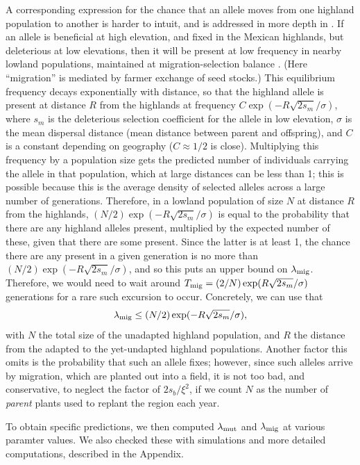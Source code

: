 A corresponding expression for the chance that an allele moves from one highland population to another is harder to intuit,
and is addressed in more depth in \citep{ralphcoop2013patches}.
If an allele is beneficial at high elevation, and fixed in the Mexican highlands,
but deleterious at low elevations,
then it will be present at low frequency in nearby lowland populations,
maintained at migration-selection balance \citep{slatkin1973geneflow}.
(Here ``migration'' is mediated by farmer exchange of seed stocks.)
This equilibrium frequency decays exponentially with distance,
so that the highland allele is present at distance $R$ from the highlands at frequency $C \exp(- R \sqrt{2s_m} / \sigma)$,
where $s_m$ is the deleterious selection coefficient for the allele in low elevation,
$\sigma$ is the mean dispersal distance (mean distance between parent and offspring),
and $C$ is a constant depending on geography ($C\approx 1/2$ is close).
Multiplying this frequency by a population size gets the predicted number of individuals carrying the allele in that population,
which at large distances can be less than 1;
this is possible because this is the average density of selected alleles across a large number of generations.
Therefore, in a lowland population of size $N$ at distance $R$ from the highlands,
$(N/2)  \exp(- R \sqrt{2s_m} / \sigma)$ is equal to the probability that there are any highland alleles present,
multiplied by the expected number of these, given that there are some present.
Since the latter is at least 1,
the chance there are any present in a given generation is no more than $(N/2) \exp(- R \sqrt{2s_m} / \sigma)$,
and so this puts an upper bound on $\lambda_{\text{mig}}$.
Therefore, we would need to wait around $T_{\text{mig}} = (2/N)\exp(R \sqrt{2s_m} / \sigma)$ generations 
for a rare such excursion to occur.
Concretely, we can use that
\begin{align}
  \lambda_{\text{mig}} \le (N/2)  \exp(- R \sqrt{2s_m} / \sigma) ,
\end{align}
with $N$ the total size of the unadapted highland population,
and $R$ the distance from the adapted to the yet-undapted highland populations.
Another factor this omits is the probability that such an allele fixes;
however, since such alleles arrive by migration, which are planted out into a field,
it is not too bad, and conservative, to neglect the factor of $2s_b/\xi^2$,
if we count $N$ as the number of \emph{parent} plants used to replant the region each year.

To obtain specific predictions,
we then computed $\lambda_{\text{mut}}$ and $\lambda_{\text{mig}}$ at various paramter values.
We also checked these with simulations and more detailed computations,
described in the Appendix.
